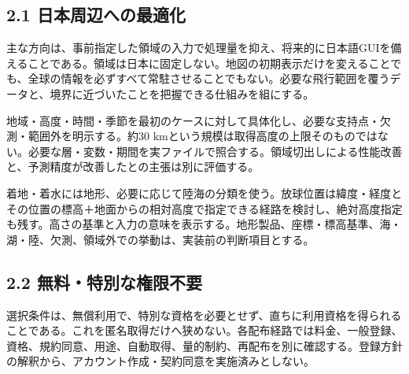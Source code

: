 \documentclass[11pt,a4paper]{article}
\begin{document}
\subsection{2.1
日本周辺への最適化}\label{ux65e5ux672cux5468ux8fbaux3078ux306eux6700ux9069ux5316}

主な方向は、事前指定した領域の入力で処理量を抑え、将来的に日本語GUIを備えることである。領域は日本に固定しない。地図の初期表示だけを変えることでも、全球の情報を必ずすべて常駐させることでもない。必要な飛行範囲を覆うデータと、境界に近づいたことを把握できる仕組みを組にする。

地域・高度・時間・季節を最初のケースに対して具体化し、必要な支持点・欠測・範囲外を明示する。約30
kmという規模は取得高度の上限そのものではない。必要な層・変数・期間を実ファイルで照合する。領域切出しによる性能改善と、予測精度が改善したとの主張は別に評価する。

着地・着水には地形、必要に応じて陸海の分類を使う。放球位置は緯度・経度とその位置の標高＋地面からの相対高度で指定できる経路を検討し、絶対高度指定も残す。高さの基準と入力の意味を表示する。地形製品、座標・標高基準、海・湖・陸、欠測、領域外での挙動は、実装前の判断項目とする。

\subsection{2.2
無料・特別な権限不要}\label{ux7121ux6599ux7279ux5225ux306aux6a29ux9650ux4e0dux8981}

選択条件は、無償利用で、特別な資格を必要とせず、直ちに利用資格を得られることである。これを匿名取得だけへ狭めない。各配布経路では料金、一般登録、資格、規約同意、用途、自動取得、量的制約、再配布を別に確認する。登録方針の解釈から、アカウント作成・契約同意を実施済みとしない。
\end{document}
